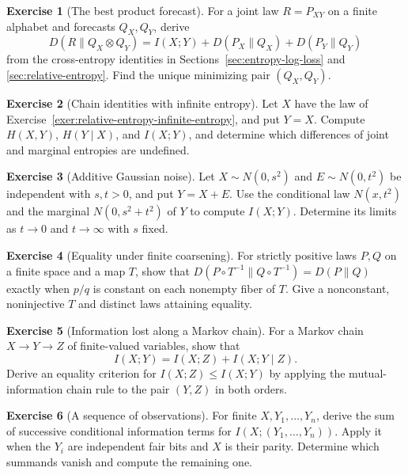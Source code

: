 \documentclass[11pt,oneside]{book}
\theoremstyle{definition}
\newtheorem{exercise}{Exercise}[section]
\theoremstyle{remark}
\begin{document}
\begin{exercise}[The best product forecast]
\label{exer:mutual-information-product-forecast}
For a joint law $R=P_{XY}$ on a finite alphabet and forecasts
$Q_X,Q_Y$, derive
\[
D(R\|Q_X\otimes Q_Y)
=I(X;Y)+D(P_X\|Q_X)+D(P_Y\|Q_Y)
\]
from the cross-entropy identities in
Sections~\ref{sec:entropy-log-loss} and \ref{sec:relative-entropy}.
Find the unique minimizing pair $(Q_X,Q_Y)$.
\end{exercise}

\begin{exercise}[Chain identities with infinite entropy]
\label{exer:mutual-information-infinite-copy}
Let $X$ have the law of
Exercise~\ref{exer:relative-entropy-infinite-entropy}, and put $Y=X$.
Compute $H(X,Y)$, $H(Y\mid X)$, and $I(X;Y)$, and determine
which differences of joint and marginal entropies are undefined.
\end{exercise}

\begin{exercise}[Additive Gaussian noise]
\label{exer:mutual-information-normal-channel}
Let $X\sim N(0,s^2)$ and $E\sim N(0,t^2)$ be independent with
$s,t>0$, and put $Y=X+E$. Use the conditional law $N(x,t^2)$
and the marginal $N(0,s^2+t^2)$ of $Y$ to compute $I(X;Y)$.
Determine its limits as $t\to0$ and $t\to\infty$ with $s$ fixed.
\end{exercise}

\begin{exercise}[Equality under finite coarsening]
\label{exer:relative-entropy-processing-equality}
For strictly positive laws $P,Q$ on a finite space and a map $T$,
show that $D(P\circ T^{-1}\|Q\circ T^{-1})=D(P\|Q)$ exactly
when $p/q$ is constant on each nonempty fiber of $T$. Give a
nonconstant, noninjective $T$ and distinct laws attaining equality.
\end{exercise}

\begin{exercise}[Information lost along a Markov chain]
\label{exer:mutual-information-processing-gap}
For a Markov chain $X\to Y\to Z$ of finite-valued variables, show that
\[
I(X;Y)=I(X;Z)+I(X;Y\mid Z).
\]
Derive an equality criterion for $I(X;Z)\leq I(X;Y)$ by applying
the mutual-information chain rule to the pair $(Y,Z)$ in both orders.
\end{exercise}

\begin{exercise}[A sequence of observations]
\label{exer:mutual-information-sequence}
For finite $X,Y_1,\ldots,Y_n$, derive the sum of successive conditional
information terms for $I(X;(Y_1,\ldots,Y_n))$. Apply it when the
$Y_i$ are independent fair bits and $X$ is their parity. Determine
which summands vanish and compute the remaining one.
\end{exercise}
\end{document}
